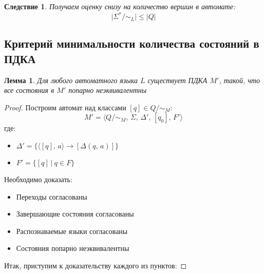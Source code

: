 \documentclass[a4paper,12pt]{article}
\renewcommand{\leq}{\ensuremath{\leqslant}}
\theoremstyle{plain}
\newtheorem{lemma}{Лемма}[subsection]
\newtheorem*{corollary}{Следствие}
\theoremstyle{definition}
\theoremstyle{remark}
\begin{document}
\begin{corollary}
	Получаем оценку снизу на количество вершин в автомате:
	\[
		\vert\Sigma^*/\sim_L\vert \leq \vert Q\vert
	\]
\end{corollary}

\subsection{Критерий минимальности количества состояний в ПДКА}
\begin{lemma}
	Для любого автоматного языка $L$ существует ПДКА $M'$, такой, что все состояния в $M'$ попарно неэквивалентны
\end{lemma}

\begin{proof}
	Построим автомат над классами $[q] \in Q / \sim_M$:
	\[M' = \langle Q/\sim_M,\, \Sigma,\, \Delta',\, [q_0],\, F'\rangle\]
	где:
	\begin{itemize}
		\item $\Delta' = \{\langle[q],\, a\rangle \to [\Delta(q,\,a)]\}$
		\item $F' = \{[q] \:|\: q \in F\}$
	\end{itemize}
	Необходимо доказать:
	\begin{itemize}
		\item Переходы согласованы
		\item Завершающие состояния согласованы
		\item Распознаваемые языки согласованы
		\item Состояния попарно неэквивалентны
	\end{itemize}
	Итак, приступим к доказательству каждого из пунктов:


\end{proof}
\end{document}
